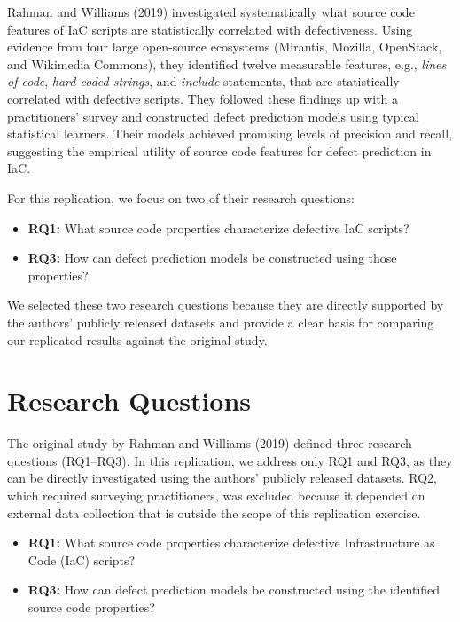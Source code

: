 \documentclass[conference]{IEEEtran}
\begin{document}
Rahman and Williams (2019) investigated systematically what source code features of IaC scripts are statistically correlated with defectiveness. Using evidence from four large open-source ecosystems (Mirantis, Mozilla, OpenStack, and Wikimedia Commons), they identified twelve measurable features, e.g., \emph{lines of code}, \emph{hard-coded strings}, and \emph{include} statements, that are statistically correlated with defective scripts.	They followed these findings up with a practitioners' survey and constructed defect prediction models using typical statistical learners. Their models achieved promising levels of precision and recall, suggesting the empirical utility of source code features for defect prediction in IaC. 
	
	For this replication, we focus on two of their research questions:
	\begin{itemize}
		\item \textbf{RQ1:} What source code properties characterize defective IaC scripts?
		\item \textbf{RQ3:} How can defect prediction models be constructed using those properties?
	\end{itemize}
	We selected these two research questions because they are directly supported by the authors' publicly released datasets and provide a clear basis for comparing our replicated results against the original study.
	
	\section{Research Questions}
	The original study by Rahman and Williams (2019) defined three research questions (RQ1–RQ3). 
	In this replication, we address only RQ1 and RQ3, as they can be directly investigated using the authors’ publicly released datasets. 
	RQ2, which required surveying practitioners, was excluded because it depended on external data collection that is outside the scope of this replication exercise.
	
	\begin{itemize}
		\item \textbf{RQ1:} What source code properties characterize defective Infrastructure as Code (IaC) scripts?
		\item \textbf{RQ3:} How can defect prediction models be constructed using the identified source code properties?
	\end{itemize}
	
\end{document}
